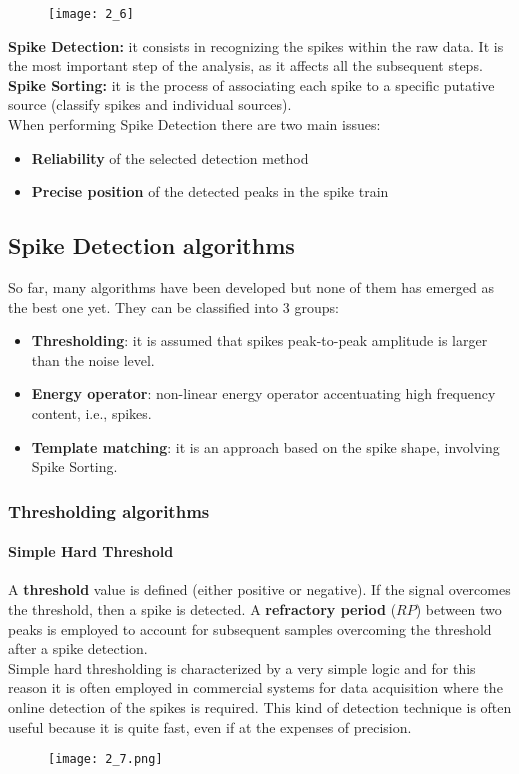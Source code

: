 \begin{figure}[H]
    \texttt{[image: 2\_6]}
    \centering
\end{figure}
\textbf{Spike Detection:} it consists in recognizing the spikes within the raw data. It is the most
important step of the analysis, as it affects all the subsequent steps.\\
\textbf{Spike Sorting:} it is the process of associating each spike to a specific putative source
(classify spikes and individual sources).\\
When performing Spike Detection there are two main issues:
\begin{itemize}
    \item \textbf{Reliability} of the selected detection method
    \item \textbf{Precise position} of the detected peaks in the spike train
\end{itemize}

\subsection{Spike Detection algorithms}
So far, many algorithms have been developed but none of them has emerged as the best one yet.
They can be classified into 3 groups:
\begin{itemize}
    \item \textbf{Thresholding}: it is assumed that spikes peak-to-peak amplitude is larger than the noise level.
    \item \textbf{Energy operator}: non-linear energy operator accentuating high frequency content, i.e., spikes.
    \item \textbf{Template matching}: it is an approach based on the spike shape, involving Spike Sorting.
\end{itemize}
\subsubsection{Thresholding algorithms}
\paragraph{Simple Hard Threshold}
A \textbf{threshold} value is defined (either positive or negative). If the signal overcomes the threshold,
then a spike is detected. A \textbf{refractory period} (\(RP\)) between two peaks is employed to account for
subsequent samples overcoming the threshold after a spike detection.\\
Simple hard thresholding is characterized by a very simple logic and for this reason it is often employed in
commercial systems for data acquisition where the online detection of the spikes is required. This kind of
detection technique is often useful because it is quite fast, even if at the expenses of precision.
\begin{figure}[H]
    \centering
    \texttt{[image: 2\_7.png]}
\end{figure}
